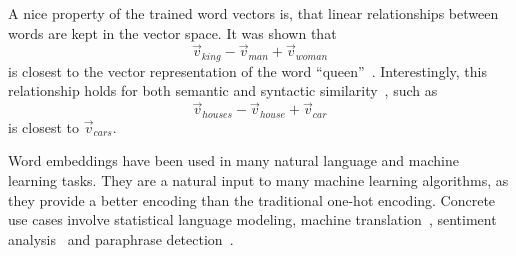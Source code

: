 \documentclass[
        a4paper,
        titlepage,
        twoside,
        parskip,
        numbers=noenddot
        ]{scrbook}
\theoremstyle{break}
\begin{document}
A nice property of the trained word vectors is, that linear relationships between words are kept in the vector space.
It was shown that
\begin{equation*}
  \vec{v}_{king} - \vec{v}_{man} + \vec{v}_{woman}
\end{equation*}
is closest to the vector representation of the word ``queen''~\cite{Mikolov2013b}.
Interestingly, this relationship holds for both semantic and syntactic similarity~\cite{Mikolov2013a}, such as
\begin{equation*}
  \vec{v}_{houses} - \vec{v}_{house} + \vec{v}_{car}
\end{equation*}
is closest to $\vec{v}_{cars}$.

Word embeddings have been used in many natural language and machine learning tasks.
They are a natural input to many machine learning algorithms, as they provide a better encoding than the traditional one-hot encoding.
Concrete use cases involve statistical language modeling, machine translation~\cite{Zou2013}, sentiment analysis~\cite{Maas2011} and paraphrase detection~\cite{Mikolov2013a}.


\end{document}
